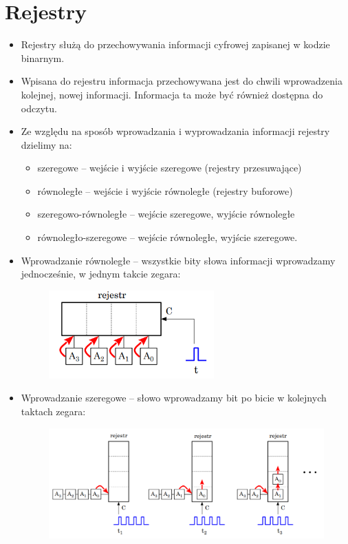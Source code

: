 \section{Rejestry}

\begin{itemize}
    \item Rejestry służą do przechowywania informacji cyfrowej zapisanej w kodzie binarnym.
    \item Wpisana do rejestru informacja przechowywana jest do chwili wprowadzenia kolejnej, nowej informacji. Informacja ta może być również dostępna do odczytu.
    \item Ze względu na sposób wprowadzania i wyprowadzania informacji rejestry dzielimy na:
        \begin{itemize}
            \item szeregowe – wejście i wyjście szeregowe (rejestry przesuwające)
            \item równoległe – wejście i wyjście równoległe (rejestry buforowe)
            \item szeregowo-równoległe – wejście szeregowe, wyjście równoległe
            \item równoległo-szeregowe – wejście równoległe, wyjście szeregowe.
        \end{itemize}
    \item Wprowadzanie równoległe – wszystkie bity słowa informacji wprowadzamy jednocześnie, w jednym takcie zegara:
        \begin{figure}[H]
            \centering
            \includegraphics[width=0.6\textwidth]{img/schemes/rejestr_rownolegle.png}
            \label{rejestr:schemat_rownolegle}
        \end{figure}
    \item Wprowadzanie szeregowe – słowo wprowadzamy bit po bicie w kolejnych taktach zegara:
        \begin{figure}[H]
            \centering
            \includegraphics[width=\textwidth]{img/schemes/rejestr_szeregowo.png}
            \label{rejestr:schemat_szeregowo}
        \end{figure}
\end{itemize}